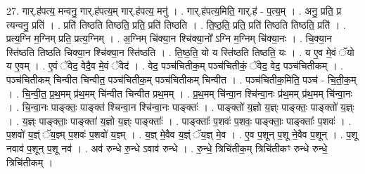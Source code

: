 \documentclass[17pt]{extarticle}
\begin{document}
27. गार्.ह॑पत्य॒ मन्वनु॒ गार्.ह॑पत्य॒म् गार्.ह॑पत्य॒ मनु॑ । . गार्.ह॑पत्य॒मिति॒ गार्.ह॑ - प॒त्य॒म् । . अनु॒ प्रति॒ प्र त्यन्वनु॒ प्रति॑ । . प्रति॑ तिष्ठति तिष्ठति॒ प्रति॒ प्रति॑ तिष्ठति । . ति॒ष्ठ॒ति॒ प्रति॒ प्रति॑ तिष्ठति तिष्ठति॒ प्रति॑ । . प्रत्य॒ग्नि म॒ग्निम् प्रति॒ प्रत्य॒ग्निम् । . अ॒ग्निम् चि॑क्या॒न श्चि॑क्या॒नो᳚ ऽग्नि म॒ग्निम् चि॑क्या॒नः । . चि॒क्या॒न स्ति॑ष्ठति तिष्ठति चिक्या॒न श्चि॑क्या॒न स्ति॑ष्ठति । . ति॒ष्ठ॒ति॒ यो य स्ति॑ष्ठति तिष्ठति॒ यः । . य ए॒व मे॒वं ॅयो य ए॒वम् । . ए॒वं ॅवेद॒ वेदै॒व मे॒वं ॅवेद॑ । . वेद॒ पञ्च॑चितीक॒म् पञ्च॑चितीकं॒ ॅवेद॒ वेद॒ पञ्च॑चितीकम् । . पञ्च॑चितीकम् चिन्वीत चिन्वीत॒ पञ्च॑चितीक॒म् पञ्च॑चितीकम् चिन्वीत । . पञ्च॑चितीक॒मिति॒ पञ्च॑ - चि॒ती॒क॒म् । . चि॒न्वी॒त॒ प्र॒थ॒मम् प्र॑थ॒मम् चि॑न्वीत चिन्वीत प्रथ॒मम् । . प्र॒थ॒मम् चि॑न्वा॒न श्चि॑न्वा॒नः प्र॑थ॒मम् प्र॑थ॒मम् चि॑न्वा॒नः । . चि॒न्वा॒नः पाङ्क्तः॒ पाङ्क्त॑ श्चिन्वा॒न श्चि॑न्वा॒नः पाङ्क्तः॑ । . पाङ्क्तो॑ य॒ज्ञो य॒ज्ञ्ः पाङ्क्तः॒ पाङ्क्तो॑ य॒ज्ञ्ः । . य॒ज्ञ्ः पाङ्क्ताः॒ पाङ्क्ता॑ य॒ज्ञो य॒ज्ञ्ः पाङ्क्ताः᳚ । . पाङ्क्ताः᳚ प॒शवः॑ प॒शवः॒ पाङ्क्ताः॒ पाङ्क्ताः᳚ प॒शवः॑ । . प॒शवो॑ य॒ज्ञ्ं ॅय॒ज्ञ्म् प॒शवः॑ प॒शवो॑ य॒ज्ञ्म् । . य॒ज्ञ् मे॒वैव य॒ज्ञ्ं ॅय॒ज्ञ् मे॒व । . ए॒व प॒शून् प॒शू ने॒वैव प॒शून् । . प॒शू नवाव॑ प॒शून् प॒शू नव॑ । . अव॑ रुन्धे रु॒न्धे ऽवाव॑ रुन्धे । . रु॒न्धे॒ त्रिचि॑तीक॒म् त्रिचि॑तीकꣳ रुन्धे रुन्धे॒ त्रिचि॑तीकम् । \newline
\end{document}
